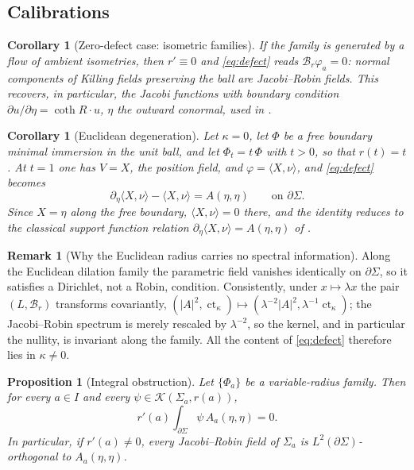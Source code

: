 \documentclass[11pt,a4paper]{amsart}
\theoremstyle{plain}
\newtheorem{proposition}[theorem]{Proposition}
\newtheorem{corollary}[theorem]{Corollary}
\theoremstyle{definition}
\newtheorem{remark}[theorem]{Remark}
\newcommand{\ct}{\operatorname{ct}_\kappa}
\newcommand{\Ker}{\mathcal{K}}
\begin{document}
\subsection*{Calibrations}

\begin{corollary}[Zero-defect case: isometric families]\label{cor:killing}
If the family is generated by a flow of ambient isometries, then $r'\equiv 0$ and \eqref{eq:defect} reads $\mathcal{B}_{r}\varphi_a=0$: normal components of Killing fields preserving the ball are Jacobi--Robin fields. This recovers, in particular, the Jacobi functions with boundary condition $\partial u/\partial\eta=\coth R\cdot u$, $\eta$ the outward conormal, used in \cite[eq. (26)]{LX18}.
\end{corollary}

\begin{corollary}[Euclidean degeneration]\label{cor:euclid}
Let $\kappa=0$, let $\Phi$ be a free boundary minimal immersion in the unit ball, and let $\Phi_t=t\,\Phi$ with $t>0$, so that $r(t)=t$. At $t=1$ one has $V=X$, the position field, and $\varphi=\langle X,\nu\rangle$, and \eqref{eq:defect} becomes
\[
\partial_\eta\langle X,\nu\rangle-\langle X,\nu\rangle=A(\eta,\eta)\qquad\text{on }\partial\Sigma.
\]
Since $X=\eta$ along the free boundary, $\langle X,\nu\rangle=0$ there, and the identity reduces to the classical support function relation $\partial_\eta\langle X,\nu\rangle=A(\eta,\eta)$ of \cite{FS16,AN16,Dev19,Tra20}.
\end{corollary}

\begin{remark}[Why the Euclidean radius carries no spectral information]\label{rem:scaling}
Along the Euclidean dilation family the parametric field vanishes identically on $\partial\Sigma$, so it satisfies a Dirichlet, not a Robin, condition. Consistently, under $x\mapsto\lambda x$ the pair $(L,\mathcal{B}_r)$ transforms covariantly, $(|A|^2,\ct)\mapsto(\lambda^{-2}|A|^2,\lambda^{-1}\ct)$; the Jacobi--Robin spectrum is merely rescaled by $\lambda^{-2}$, so the kernel, and in particular the nullity, is invariant along the family. All the content of \eqref{eq:defect} therefore lies in $\kappa\neq 0$.
\end{remark}

\begin{proposition}[Integral obstruction]\label{prop:pairing}
Let $\{\Phi_a\}$ be a variable-radius family. Then for every $a\in I$ and every $\psi\in\Ker(\Sigma_a,r(a))$,
\begin{equation}\label{eq:pairing}
r'(a)\int_{\partial\Sigma}\psi\,A_a(\eta,\eta)=0 .
\end{equation}
In particular, if $r'(a)\neq 0$, every Jacobi--Robin field of $\Sigma_a$ is $L^2(\partial\Sigma)$-orthogonal to $A_a(\eta,\eta)$.
\end{proposition}
\end{document}

